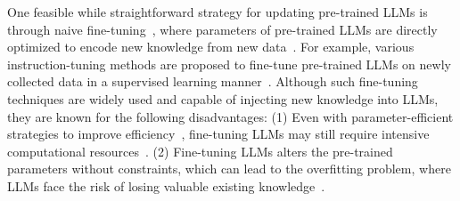 \documentclass[acmsmall, screen]{acmart}
\begin{document}
One feasible while straightforward strategy for updating pre-trained LLMs is through naive fine-tuning~\cite{dubois2023alpacafarm, alpaca, wei2021finetuned,chung2022scaling}, where parameters of pre-trained LLMs are directly optimized to encode new knowledge from new data~\cite{zhao2023survey, azamfirei2023large, peng2023check, menick2022teaching}. For example, various instruction-tuning methods are proposed to fine-tune pre-trained LLMs on newly collected data in a supervised learning manner~\cite{Wang2022SelfInstructAL,peng2023instruction,wang2023aligning,min2023recent}. Although such fine-tuning techniques are widely used and capable of injecting new knowledge into LLMs, they are known for the following disadvantages: (1) Even with parameter-efficient strategies to improve efficiency~\cite{liu2022few,zaken2022bitfit,wang2022adamix}, fine-tuning LLMs may still require intensive computational resources~\cite{SERAC,IKE, meng2022locating}. 
{(2) Fine-tuning LLMs alters the pre-trained parameters without constraints, which can lead to the overfitting problem, where LLMs face the risk of losing valuable existing knowledge~\cite{zhang2024comprehensive}.} %


\end{document}
